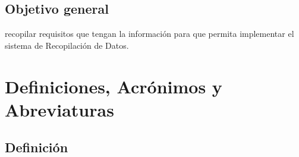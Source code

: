 \documentclass[12pt,a4paper]{article}
\begin{document}
    
    \subsection*{Objetivo general }
    recopilar requisitos que tengan la información para que permita implementar el sistema de Recopilación de Datos.
    
    
    \section{Definiciones, Acrónimos y Abreviaturas}
    \subsection*{Definición}

    \printglossaries
\end{document}
